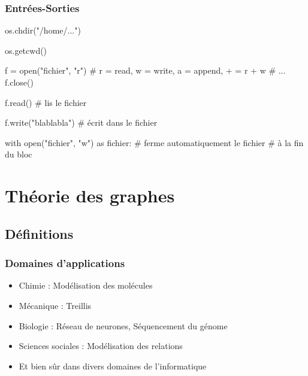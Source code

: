 \documentclass{beamer}
\let\oldsubsubsection\subsubsection
\renewcommand{\subsubsection}[2][]{\def\currentsubsubsection{#2}\oldsubsubsection[#1]{#2}}
\begin{document}
\subsubsection{Entrées-Sorties}
\begin{code}{\codeboxa}
os.chdir("/home/...")
  
os.getcwd()
  
f = open("fichier", "r") 
# r = read, w = write, a = append, + = r + w
# ...
f.close()
\end{code}
\begin{code}{\codeboxb}
f.read() # lis le fichier
  
f.write("blablabla") # écrit dans le fichier
  
with open("fichier", "w") as fichier:
    # ferme automatiquement le fichier
    # à la fin du bloc
\end{code}
\begin{frame}
  \begin{overprint}
    \usebox\codeboxa
    \usebox\codeboxb
  \end{overprint}
\end{frame}

\section{Théorie des graphes}
\subsection{Définitions}
\subsubsection{Domaines d'applications}
\begin{frame}
    \begin{itemize}
        \item Chimie : Modélisation des molécules
        
        \item Mécanique : Treillis
        
        \item Biologie : Réseau de neurones, Séquencement du génome
        
        \item Sciences sociales : Modélisation des relations

        \item Et bien sûr dans divers domaines de l'informatique
    \end{itemize}
\end{frame}
\end{document}
